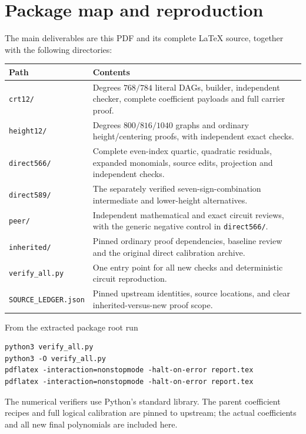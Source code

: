 \documentclass[11pt]{article}
\newcommand{\file}[1]{\nolinkurl{#1}}
\theoremstyle{definition}\newtheorem{definition}[theorem]{Definition}
\theoremstyle{remark}\newtheorem{remark}[theorem]{Remark}
\begin{document}
\section{Package map and reproduction}
The main deliverables are this PDF and its complete LaTeX source, together
with the following directories:
\begin{center}\small
\begin{tabular}{p{}p{}}
\toprule
Path & Contents\\\midrule
\file{crt12/}&Degrees $768/784$ literal DAGs, builder, independent checker,
complete coefficient payloads and full carrier proof.\\
\file{height12/}&Degrees $800/816/1040$ graphs and ordinary height/centering
proofs, with independent exact checks.\\
\file{direct566/}&Complete even-index quartic, quadratic residuals,
expanded monomials, source edits, projection and independent checks.\\
\file{direct589/}&The separately verified seven-sign-combination
intermediate and lower-height alternatives.\\
\file{peer/}&Independent mathematical and exact circuit reviews,
with the generic negative control in \file{direct566/}.\\
\file{inherited/}&Pinned ordinary proof dependencies, baseline review and
the original direct calibration archive.\\
\file{verify_all.py}&One entry point for all new checks and
deterministic circuit reproduction.\\
\file{SOURCE_LEDGER.json}&Pinned upstream identities, source locations,
and clear inherited-versus-new proof scope.\\
\bottomrule
\end{tabular}
\end{center}
From the extracted package root run
\begin{verbatim}
python3 verify_all.py
python3 -O verify_all.py
pdflatex -interaction=nonstopmode -halt-on-error report.tex
pdflatex -interaction=nonstopmode -halt-on-error report.tex
\end{verbatim}
The numerical verifiers use Python's standard library. The parent
coefficient recipes and full logical calibration are pinned to upstream;
the actual coefficients and all new final polynomials are included here.
\end{document}
